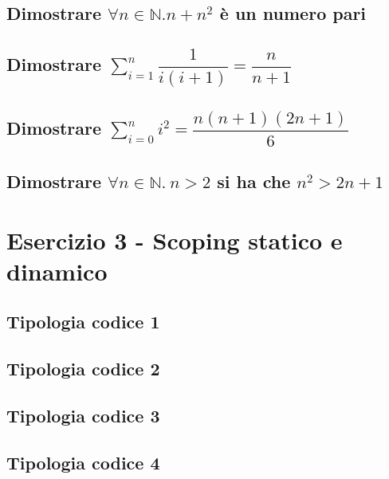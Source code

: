 \documentclass[a4paper]{article}
\begin{document}
	\subsection{Dimostrare $\forall n \in \mathbb{N}.n + n^{2}$ è un numero pari}
	
	\subsection{Dimostrare $\displaystyle\sum_{i=1}^{n}\dfrac{1}{i\left(i+1\right)} = \dfrac{n}{n+1}$}
	
	\subsection{Dimostrare $\displaystyle\sum_{i=0}^{n} i^{2} = \dfrac{n\left(n+1\right)\left(2n+1\right)}{6}$}
	
	\subsection{Dimostrare $\forall n \in \mathbb{N}. \: n > 2$ si ha che $n^{2} > 2n + 1$}
	
	\section{Esercizio 3 - Scoping statico e dinamico}
	
	\subsection{Tipologia codice 1}
	
	
	\subsection{Tipologia codice 2}
	
	
	\subsection{Tipologia codice 3}
	
	
	\subsection{Tipologia codice 4}
	
	
\end{document}
